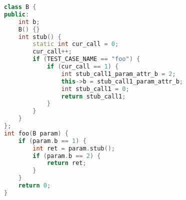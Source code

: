 \begin{figure}[h]
\begin{lstlisting}[language=C++, caption={Sự thay đổi của hàm \tcode{stub} với bộ dữ liệu kiểm thử mới.}, label={cod:stub-final}, captionpos=b]
class B {
public:
    int b;
    B() {}
    int stub() {
        static int cur_call = 0;
        cur_call++;
        if (TEST_CASE_NAME == "foo") {
            if (cur_call == 1) {
                int stub_call1_param_attr_b = 2;
                this->b = stub_call1_param_attr_b;
                int stub_call1 = 0;
                return stub_call1;
            }
        }
    }
};
int foo(B param) {
    if (param.b == 1) {
        int ret = param.stub();
        if (param.b == 2) {
            return ret;
        }
    }
    return 0;
}
    \end{lstlisting}
\end{figure}